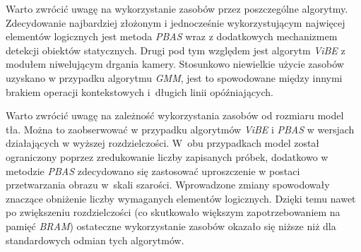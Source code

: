 Warto zwrócić uwagę na wykorzystanie zasobów przez poszczególne algorytmy. Zdecydowanie najbardziej złożonym i jednocześnie wykorzystującym najwięcej elementów logicznych jest metoda \textit{PBAS} wraz z dodatkowych mechanizmem detekcji obiektów statycznych. Drugi pod tym względem jest algorytm \textit{ViBE} z modułem niwelującym drgania kamery. Stosunkowo niewielkie użycie zasobów uzyskano w przypadku algorytmu \textit{GMM}, jest to spowodowane między innymi brakiem operacji kontekstowych i~długich linii opóźniających.

Warto zwrócić uwagę na zależność wykorzystania zasobów od rozmiaru model tła. Można to zaobserwować w przypadku algorytmów \textit{ViBE} i \textit{PBAS} w wersjach działających w wyższej rozdzielczości. W~obu przypadkach model został ograniczony poprzez zredukowanie liczby zapisanych próbek, dodatkowo w metodzie \textit{PBAS} zdecydowano się zastosować uproszczenie w postaci przetwarzania obrazu w~skali szarości. Wprowadzone zmiany spowodowały znaczące obniżenie liczby wymaganych elementów logicznych. Dzięki temu nawet po zwiększeniu rozdzielczości (co skutkowało większym zapotrzebowaniem na pamięć \textit{BRAM}) ostateczne wykorzystanie zasobów okazało się niższe niż dla standardowych odmian tych algorytmów. 
